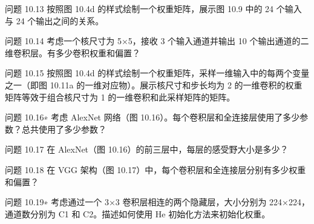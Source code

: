 问题 10.13 按照图 10.4d 的样式绘制一个权重矩阵，展示图 10.9 中的 24 个输入与 24 个输出之间的关系。

问题 10.14 考虑一个核尺寸为 5×5，接收 3 个输入通道并输出 10 个输出通道的二维卷积层。有多少卷积权重和偏置？

问题 10.15 按照图 10.4d 的样式绘制一个权重矩阵，采样一维输入中的每两个变量之一（即图 10.11a 的一维对应物）。展示核尺寸和步长均为 2 的一维卷积的权重矩阵等效于组合核尺寸为 1 的一维卷积和此采样矩阵的矩阵。

问题 10.16∗ 考虑 AlexNet 网络（图 10.16）。每个卷积层和全连接层使用了多少参数？总共使用了多少参数？

问题 10.17 在 AlexNet（图 10.16）的前三层中，每层的感受野大小是多少？

问题 10.18 在 VGG 架构（图 10.17）中，每个卷积层和全连接层分别有多少权重和偏置？

问题 10.19∗ 考虑通过一个 3×3 卷积层相连的两个隐藏层，大小分别为 224×224，通道数分别为 C1 和 C2。描述如何使用 He 初始化方法来初始化权重。